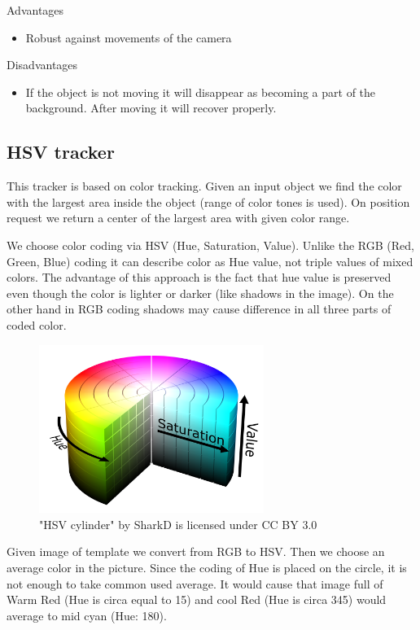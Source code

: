 Advantages
\begin{itemize}
\item Robust against movements of the camera
\end{itemize}

Disadvantages
\begin{itemize}
\item If the object is not moving it will disappear as becoming a part of the
background. After moving it will recover properly.
\end{itemize}

\subsection{HSV tracker}

This tracker is based on color tracking. Given an input object we find the
color with the largest area inside the object (range of color tones is used).
On position request we return a center of the largest area with given color
range.

We choose color coding via HSV (Hue, Saturation, Value). Unlike the RGB (Red,
Green, Blue) coding it can describe color as Hue value, not triple values of
mixed colors. The advantage of this approach is the fact that hue value is
preserved even though the color is lighter or darker (like shadows in the
image). On the other hand in RGB coding shadows may cause difference in all
three parts of coded color.

\begin{figure}[h!]\centering
\includegraphics[width=0.65\textwidth]{img/hsv-cylinder.png}
\caption{"HSV cylinder" by SharkD is licensed under CC BY 3.0}
\end{figure}

Given image of template we convert from RGB to HSV. Then we choose an average
color in the picture. Since the coding of Hue is placed on the circle, it is
not enough to take common used average. It would cause that image full of Warm
Red (Hue is circa equal to 15) and cool Red (Hue is circa 345) would average to
mid cyan (Hue: 180).

